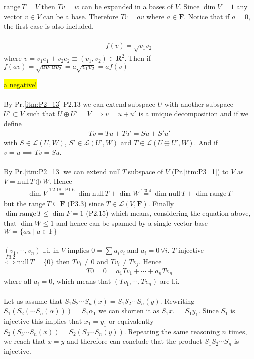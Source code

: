 \documentclass[11pt,notitlepage,oneside]{article}
\newcommand{\hilight}[1]{\colorbox{yellow}{#1}}
\DeclareMathOperator{\dimension}{dim}
\newcommand{\pref}[1]{Pr.\ref{#1}}
\newcommand{\exo}[1]{%
\addtocontents{toc}{\protect\setcounter{tocdepth}{2}}%
\paragraph{#1}}
\newcommand{\nullspace}[1]{\mathrm{null}\,{#1}}
\newcommand{\rangespace}[1]{\mathrm{range}\,{#1}}
\begin{document}
  $\rangespace{T}=V$ then $Tv = w$ can be expanded in a bases of $V$. Since $\dim{V}=1$ any vector $v\in V$ can be a base. Therefore $Tv = a v$ where $a\in \mathbf{F}$. Notice that if $a=0$, the first case is also included.
  
  \exo{}
  \begin{align*}
    f(v) = \sqrt{v_1 v_2}
  \end{align*} 
  where $v=v_1e_1+v_2e_2 \equiv (v_1,v_2) \in \mathbf{R}^2$. Then if $f(av) = \sqrt{av_1 av_2} = a\sqrt{v_1v_2} = af(v)$
  
  \hilight{a negative!}
  
  \exo{} By \pref{itm:P2_13} P2.13 we can extend subspace $U$ with another subspace $U'\subset V$ such that $U\oplus U' = V \implies v = u+u'$ 
  is a unique decomposition and if we define 
\begin{align*}
  Tv = Tu+Tu' = Su + S'u'
\end{align*}  
with $S\in\mathcal{L}(U,W)$, $S'\in\mathcal{L}(U',W)$ and $T\in\mathcal{L}(U\oplus U',W)$. 
And if $v=u \implies Tv = Su$.

  \exo{} By \pref{itm:P2_13} we can extend $\nullspace{T}$ subspace of $V$ (\pref{itm:P3_1}) to $V$ as $V = \nullspace{T} \oplus W$. Hence
  \begin{align*}
  \dimension{V} \stackrel{\text{T2.18}+\text{P1.6}}{=} \dimension{\nullspace{T}} + \dimension{W} \stackrel{\text{T3.4}}{=} \dimension{\nullspace{T}} + \dimension{\rangespace{T}}
  \end{align*} 
  but the $\rangespace{T}\subseteq \mathbf{F}$ (P3.3) since $T\in\mathcal{L}(V,\mathbf{F})$. Finally $\dimension{\rangespace{T}}\leq\dimension{F}=1$ (P2.15) which means, considering the equation above, that $\dimension{W}\leq 1$ and hence can be spanned by a single-vector base $W=\{au \mid a\in\mathrm{F}\}$
  
  \exo{} $(v_1,\cdots,v_n)$ l.i. in $V$ implies $0=\sum a_iv_i$ and $a_i=0\,\forall i$. $T$ injective $\stackrel{P3.2}{\iff} \nullspace{T}=\{0\}$ then $Tv_i\neq 0$ and $Tv_i\neq Tv_j$. Hence 
  \begin{align*}
  T0 = 0 = a_1 Tv_1 + \cdots + a_n Tv_n
  \end{align*}
  where all $a_i=0$, which means that $(Tv_1,\cdots,Tv_n)$ are l.i. 
  \exo{} Let us assume that $S_1S_2\cdots S_n(x) = S_1S_2\cdots S_n(y)$. 
  Rewriting $S_1(S_2( \cdots S_n(\alpha) )) = S_1 \alpha_1$ we can shorten it as $S_1 x_1 = S_1 y_1$. 
  Since $S_1$ is injective this implies that $x_1 = y_1$ or equivalently $S_2( S_3 \cdots S_n(x)) = S_2( S_3 \cdots S_n(y))$. 
  Repeating the same reasoning $n$ times, we reach that $x=y$ and therefore can conclude that the product 
  $S_1S_2\cdots S_n$ is injective. 
  
\end{document}

